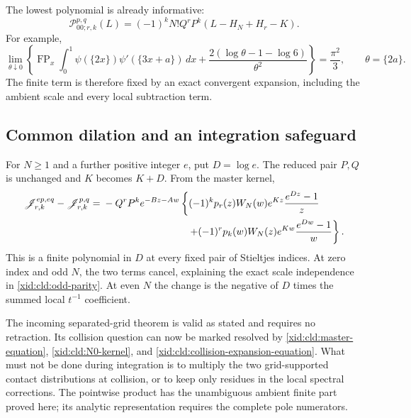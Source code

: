 \documentclass[11pt,a4paper]{article}
\numberwithin{equation}{section}
\theoremstyle{definition}
\theoremstyle{remark}
\begin{document}
The lowest polynomial is already informative:
\begin{equation}
 \mathcal P_{00;r,k}^{p,q}(L)
    =(-1)^kN!Q^rP^k(L-H_N+H_r-K).
 \label{xid:cld:lowest-collision}
\end{equation}
For example,
\[
 \lim_{\theta\downarrow0}\left\{
 \operatorname{FP}_x\int_0^1
   \psi(\{2x\})\psi'(\{3x+a\})\,dx
     +\frac{2(\log\theta-1-\log6)}{\theta^2}\right\}
 =\frac{\pi^2}{3},\qquad \theta=\{2a\}.
\]
The finite term is therefore fixed by an exact convergent expansion,
including the ambient scale and every local subtraction term.

\subsection{Common dilation and an integration safeguard}

For $N\ge1$ and a further positive integer $e$, put $D=\log e$.  The reduced pair
$P,Q$ is unchanged and $K$ becomes $K+D$.  From the master kernel,
\begin{align}
 \mathscr J_{r,k}^{ep,eq}-\mathscr J_{r,k}^{p,q}
 ={}&-Q^rP^ke^{-Bz-Aw}
   \left\{(-1)^k p_r(z)W_N(w)e^{Kz}\frac{e^{Dz}-1}{z}\right.\notag\\
 &\hspace{30mm}\left.
        +(-1)^r p_k(w)W_N(z)e^{Kw}\frac{e^{Dw}-1}{w}\right\}.
 \label{xid:cld:common-scale}
\end{align}
This is a finite polynomial in $D$ at every fixed pair of Stieltjes
indices.  At zero index and odd $N$, the two terms cancel, explaining
the exact scale independence in \eqref{xid:cld:odd-parity}.  At even $N$ the
change is the negative of $D$ times the summed local $t^{-1}$ coefficient.

The incoming separated-grid theorem is valid as stated and requires no
retraction.  Its collision question can now be marked resolved by
\eqref{xid:cld:master-equation}, \eqref{xid:cld:N0-kernel}, and
\eqref{xid:cld:collision-expansion-equation}.  What must not be done during
integration is to multiply the two grid-supported contact distributions
at collision, or to keep only residues in the local spectral corrections.
The pointwise product has the unambiguous ambient finite part proved
here; its analytic representation requires the complete pole numerators.

\end{document}
